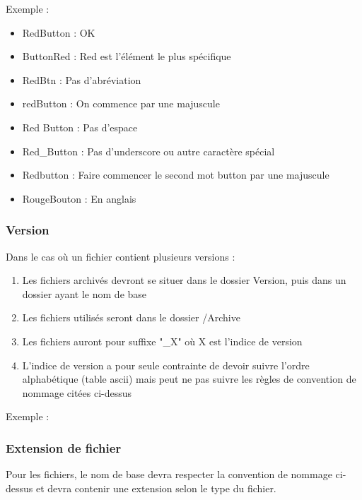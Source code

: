 Exemple :
\begin{itemize}
\item RedButton   : OK
\item ButtonRed   : Red est l'élément le plus spécifique
\item RedBtn      : Pas d'abréviation
\item redButton   : On commence par une majuscule
\item Red Button  : Pas d'espace
\item Red\_Button  : Pas d'underscore ou autre caractère spécial
\item Redbutton   : Faire commencer le second mot button par une majuscule 
\item RougeBouton : En anglais
\end{itemize}

\subsubsection{Version}

Dans le cas où un fichier contient plusieurs versions :
\begin{enumerate}
	\item Les fichiers archivés devront se situer dans le dossier Version, puis dans un dossier ayant le nom de base
	\item Les fichiers utilisés seront dans le dossier /Archive
	\item Les fichiers auront pour suffixe "\_X" où X est l'indice de version
	\item L'indice de version a pour seule contrainte de devoir suivre l'ordre alphabétique (table ascii) mais peut ne pas suivre les règles de convention de nommage citées ci-dessus
\end{enumerate}

Exemple :
\newpage
\subsubsection{Extension de fichier}
Pour les fichiers, le nom de base devra respecter la convention de nommage ci-dessus et devra contenir une extension selon le type du fichier.\\

%
%

